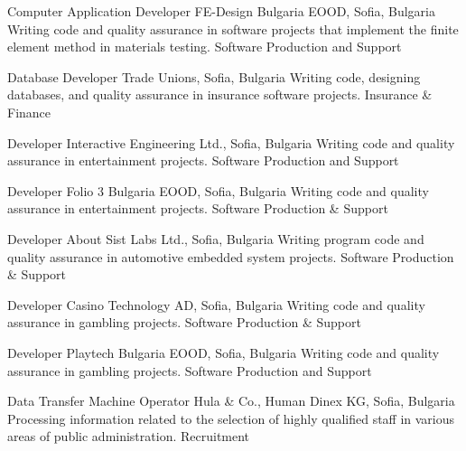 \documentclass[english,a4paper]{europasscv}
\begin{document}
\begin{europasscv}
   {Computer Application Developer}
  \ecvitem {} {FE-Design Bulgaria EOOD, Sofia, Bulgaria}
  \ecvitem {} {Writing code and quality assurance in software projects that implement the finite element method in materials testing.}
  \ecvitem {} { \quad Software Production and Support}
  
   {Database Developer}
  \ecvitem {} {Trade Unions, Sofia, Bulgaria}
  \ecvitem {} {Writing code, designing databases, and quality assurance in insurance software projects.}
  \ecvitem {} { \quad Insurance \& Finance}
  
   {Developer}
  \ecvitem {} {Interactive Engineering Ltd., Sofia, Bulgaria}
  \ecvitem {} {Writing code and quality assurance in entertainment projects.}
  \ecvitem {} { \quad Software Production and Support}
  
   {Developer}
  \ecvitem {} {Folio 3 Bulgaria EOOD, Sofia, Bulgaria}
  \ecvitem {} {Writing code and quality assurance in entertainment projects.}
  \ecvitem {} { \quad Software Production \& Support}
  
   {Developer}
  \ecvitem {} {About Sist Labs Ltd., Sofia, Bulgaria}
  \ecvitem {} {Writing program code and quality assurance in automotive embedded system projects.}
  \ecvitem {} { \quad Software Production \& Support}
  
   {Developer}
  \ecvitem {} {Casino Technology AD, Sofia, Bulgaria}
  \ecvitem {} {Writing code and quality assurance in gambling projects.}
  \ecvitem {} { \quad Software Production \& Support}

   {Developer}
  \ecvitem {} {Playtech Bulgaria EOOD, Sofia, Bulgaria}
  \ecvitem {} {Writing code and quality assurance in gambling projects.}
  \ecvitem {} { \quad Software Production and Support}
  
   {Data Transfer Machine Operator}
  \ecvitem {} {Hula \& Co., Human Dinex KG, Sofia, Bulgaria}
  \ecvitem {} {Processing information related to the selection of highly qualified staff in various areas of public administration.}
  \ecvitem {} { \quad Recruitment}
  

\end{europasscv}
\end{document}
